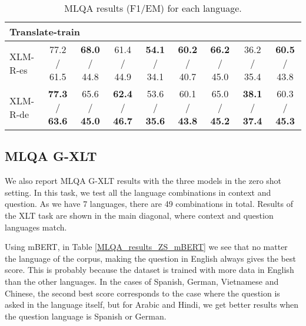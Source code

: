 \documentclass[11pt]{article}
\begin{document}
\begin{table*}[!ht]
\begin{adjustbox}{max width=\textwidth}
\begin{tabular}{l|ccccccc|c}
        \midrule
        \multicolumn{9}{l}{Translate-train} \\
        \midrule
        XLM-R-es &77.2 / 61.5 & \textbf{68.0} / 44.8 & 61.4 / 44.9 & \textbf{54.1} / 34.1 & \textbf{60.2} / 40.7 & \textbf{66.2} / 45.0 & 36.2 / 35.4 & \textbf{60.5} / 43.8 \\
        XLM-R-de & \textbf{77.3} / \textbf{63.6} & 65.6 / \textbf{45.0} & \textbf{62.4} / \textbf{46.7} & 53.6 / \textbf{35.6} & 60.1 / \textbf{43.8} & 65.0 / \textbf{45.2} & \textbf{38.1} / \textbf{37.4} & 60.3 / \textbf{45.3}\\
        \bottomrule
    \end{tabular}
    \end{adjustbox}
    \centering
    \caption{MLQA results (F1/EM) for each language.}
    \label{MLQA_results}
\end{table*}

\subsection{MLQA G-XLT}

We also report MLQA G-XLT results with the three models in the zero shot setting. In this task, we test all the language combinations in context and question. As we have 7 languages, there are 49 combinations in total. Results of the XLT task are shown in the main diagonal, where context and question languages match.

Using mBERT, in Table \ref{MLQA_results_ZS_mBERT} we see that no matter the language of the corpus, making the question in English always gives the best score. This is probably because the dataset is trained with more data in English than the other languages. In the cases of Spanish, German, Vietnamese and Chinese, the second best score corresponds to the case where the question is asked in the language itself, but for Arabic and Hindi, we get better results when the question language is Spanish or German.
\end{document}
